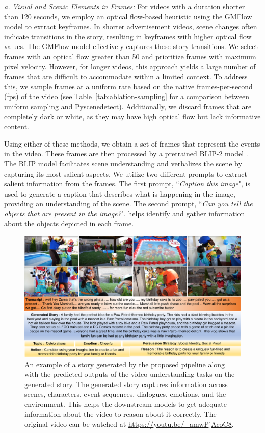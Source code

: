 \documentclass[hidelinks,11pt,a4paper]{report}
\renewcommand{\cite}[1]{\citep{#1}}
\begin{document}
\textit{a. Visual and Scenic Elements in Frames:} For videos with a duration shorter than 120 seconds, we employ an optical flow-based heuristic using the GMFlow model \cite{xu2022gmflow} to extract keyframes. In shorter advertisement videos, scene changes often indicate transitions in the story, resulting in keyframes with higher optical flow values. The GMFlow model effectively captures these story transitions. We select frames with an optical flow greater than 50 and prioritize frames with maximum pixel velocity. However, for longer videos, this approach yields a large number of frames that are difficult to accommodate within a limited context. To address this, we sample frames at a uniform rate based on the native frames-per-second (fps) of the video (see Table~\ref{tab:ablation-sampling} for a comparison between uniform sampling and Pyscenedetect). Additionally, we discard frames that are completely dark or white, as they may have high optical flow but lack informative content.

Using either of these methods, we obtain a set of frames that represent the events in the video. These frames are then processed by a pretrained BLIP-2 model \cite{li2023blip2}. The BLIP model facilitates scene understanding and verbalizes the scene by capturing its most salient aspects. We utilize two different prompts to extract salient information from the frames. The first prompt, ``\textit{Caption this image}", is used to generate a caption that describes what is happening in the image, providing an understanding of the scene. The second prompt, ``\textit{Can you tell the objects that are present in the image?}", helps identify and gather information about the objects depicted in each frame.


\begin{figure}[!t]
    \centering
    \includegraphics[width=\textwidth]{images/example-stories.pdf}
    \caption{An example of a story generated by the proposed pipeline along with the predicted outputs of the video-understanding tasks on the generated story. The generated story captures information across scenes, characters, event sequences, dialogues, emotions, and the environment. This helps the downstream models to get adequate information about the video to reason about it correctly. The original video can be watched at \url{https://youtu.be/_amwPjAcoC8}.}
    \label{fig:example-story}
\end{figure}
\end{document}
